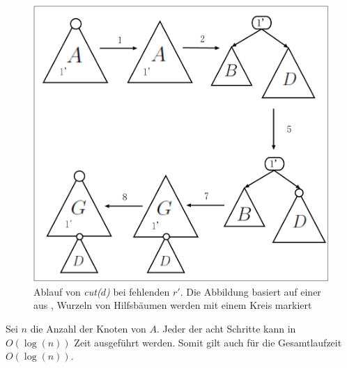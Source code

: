 \documentclass[a4paper,12pt]{article}
\begin{document}
\begin{figure}[H]
	\centering
	\includegraphics[width=1\textwidth]{"Medien/Tango/cut2"}
	\caption{Ablauf von \textit{cut($d$)} bei fehlenden $r'$. Die Abbildung basiert auf einer aus \cite{demainDinamicOpti}, Wurzeln von Hilfsbäumen werden mit einem Kreis markiert }
	\label{fig:cut2}
\end{figure}
\noindent Sei $n$ die Anzahl der Knoten von $A$. Jeder der acht Schritte kann in $O\left(\log \left(n\right)\right)$ Zeit ausgeführt werden. Somit gilt auch für die Gesamtlaufzeit $O\left(\log \left(n\right)\right)$.
\end{document}

